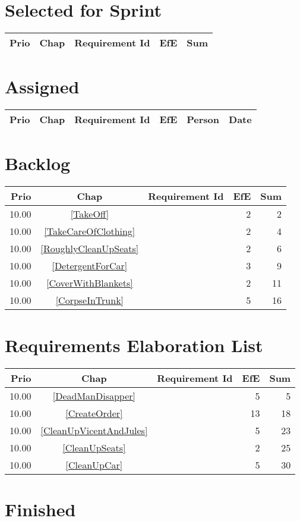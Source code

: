 \section{Selected for Sprint}
\begin{longtable}{|r|c|p{7cm}||r|r|} \hline
\textbf{Prio} & \textbf{Chap} & \textbf{Requirement Id} & \textbf{EfE} & \textbf{Sum} \\ \hline\endhead
\end{longtable}\section{Assigned}
\begin{longtable}{|r|c|p{6.5cm}||r|l|l|} \hline
\textbf{Prio} & \textbf{Chap} & \textbf{Requirement Id} & \textbf{EfE} & \textbf{Person} & \textbf{Date} \\ \hline\endhead
\end{longtable}\section{Backlog}
\begin{longtable}{|r|c|p{7cm}||r|r|} \hline
\textbf{Prio} & \textbf{Chap} & \textbf{Requirement Id} & \textbf{EfE} & \textbf{Sum} \\ \hline\endhead
10.00 & \ref{TakeOff} & \nameref{TakeOff} & 2 & 2 \\ \hline
10.00 & \ref{TakeCareOfClothing} & \nameref{TakeCareOfClothing} & 2 & 4 \\ \hline
10.00 & \ref{RoughlyCleanUpSeats} & \nameref{RoughlyCleanUpSeats} & 2 & 6 \\ \hline
10.00 & \ref{DetergentForCar} & \nameref{DetergentForCar} & 3 & 9 \\ \hline
10.00 & \ref{CoverWithBlankets} & \nameref{CoverWithBlankets} & 2 & 11 \\ \hline
10.00 & \ref{CorpseInTrunk} & \nameref{CorpseInTrunk} & 5 & 16 \\ \hline
\end{longtable}\section{Requirements Elaboration List}
\begin{longtable}{|r|c|p{7cm}||r|r|} \hline
\textbf{Prio} & \textbf{Chap} & \textbf{Requirement Id} & \textbf{EfE} & \textbf{Sum} \\ \hline\endhead
10.00 & \ref{DeadManDisapper} & \nameref{DeadManDisapper} & 5 & 5 \\ \hline
10.00 & \ref{CreateOrder} & \nameref{CreateOrder} & 13 & 18 \\ \hline
10.00 & \ref{CleanUpVicentAndJules} & \nameref{CleanUpVicentAndJules} & 5 & 23 \\ \hline
10.00 & \ref{CleanUpSeats} & \nameref{CleanUpSeats} & 2 & 25 \\ \hline
10.00 & \ref{CleanUpCar} & \nameref{CleanUpCar} & 5 & 30 \\ \hline
\end{longtable}\section{Finished}

